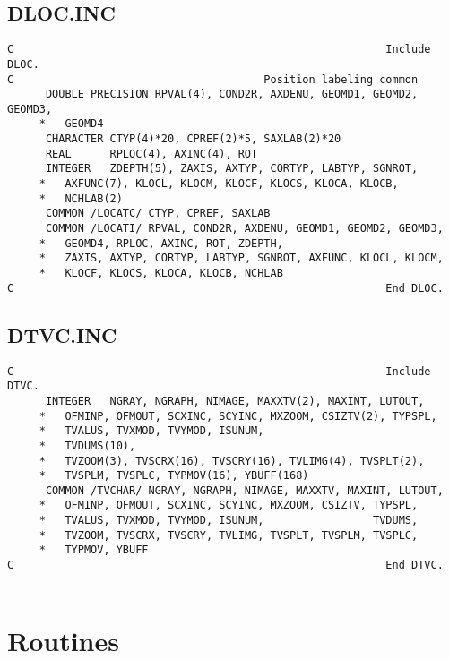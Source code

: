\subsection{DLOC.INC}

\begin{verbatim}
C                                                          Include DLOC.
C                                       Position labeling common
      DOUBLE PRECISION RPVAL(4), COND2R, AXDENU, GEOMD1, GEOMD2, GEOMD3,
     *   GEOMD4
      CHARACTER CTYP(4)*20, CPREF(2)*5, SAXLAB(2)*20
      REAL      RPLOC(4), AXINC(4), ROT
      INTEGER   ZDEPTH(5), ZAXIS, AXTYP, CORTYP, LABTYP, SGNROT,
     *   AXFUNC(7), KLOCL, KLOCM, KLOCF, KLOCS, KLOCA, KLOCB,
     *   NCHLAB(2)
      COMMON /LOCATC/ CTYP, CPREF, SAXLAB
      COMMON /LOCATI/ RPVAL, COND2R, AXDENU, GEOMD1, GEOMD2, GEOMD3,
     *   GEOMD4, RPLOC, AXINC, ROT, ZDEPTH,
     *   ZAXIS, AXTYP, CORTYP, LABTYP, SGNROT, AXFUNC, KLOCL, KLOCM,
     *   KLOCF, KLOCS, KLOCA, KLOCB, NCHLAB
C                                                          End DLOC.

\end{verbatim}
\subsection{DTVC.INC}

\begin{verbatim}
C                                                          Include DTVC.
      INTEGER   NGRAY, NGRAPH, NIMAGE, MAXXTV(2), MAXINT, LUTOUT,
     *   OFMINP, OFMOUT, SCXINC, SCYINC, MXZOOM, CSIZTV(2), TYPSPL,
     *   TVALUS, TVXMOD, TVYMOD, ISUNUM,
     *   TVDUMS(10),
     *   TVZOOM(3), TVSCRX(16), TVSCRY(16), TVLIMG(4), TVSPLT(2),
     *   TVSPLM, TVSPLC, TYPMOV(16), YBUFF(168)
      COMMON /TVCHAR/ NGRAY, NGRAPH, NIMAGE, MAXXTV, MAXINT, LUTOUT,
     *   OFMINP, OFMOUT, SCXINC, SCYINC, MXZOOM, CSIZTV, TYPSPL,
     *   TVALUS, TVXMOD, TVYMOD, ISUNUM,                 TVDUMS,
     *   TVZOOM, TVSCRX, TVSCRY, TVLIMG, TVSPLT, TVSPLM, TVSPLC,
     *   TYPMOV, YBUFF
C                                                          End DTVC.


\end{verbatim}
\section{Routines}
